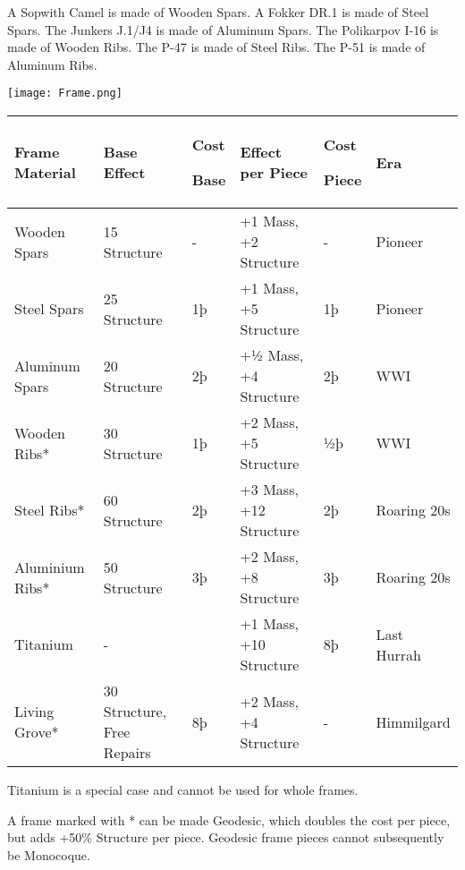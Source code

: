 \documentclass{article}
\begin{document}
A Sopwith Camel is made of Wooden Spars. A Fokker DR.1 is made of
Steel Spars. The Junkers J.1/J4 is made of Aluminum Spars. The
Polikarpov I-16 is made of Wooden Ribs. The P-47 is made of Steel Ribs.
The P-51 is made of Aluminum Ribs.

\texttt{[image: Frame.png]}

\begin{tabular}{|l|l|l|l|l|l|}
    \hline
    Frame Material  & Base Effect                & Cost

    Base            & Effect per Piece           & Cost

    Piece           & Era                                                                                 \\\hline
    Wooden Spars    & 15 Structure               & -          & +1 Mass, +2 Structure  & -  & Pioneer     \\\hline
    Steel Spars     & 25 Structure               & 1þ         & +1 Mass, +5 Structure  & 1þ &
    Pioneer                                                                                               \\\hline
    Aluminum Spars  & 20 Structure               & 2þ         & +½ Mass, +4 Structure  & 2þ & WWI         \\\hline
    Wooden Ribs*    & 30 Structure               & 1þ         & +2 Mass, +5 Structure  & ½þ & WWI         \\\hline
    Steel Ribs*     & 60 Structure               & 2þ         & +3 Mass, +12 Structure & 2þ & Roaring
    20s                                                                                                   \\\hline
    Aluminium Ribs* & 50 Structure               & 3þ         & +2 Mass, +8 Structure  & 3þ &
    Roaring 20s                                                                                           \\\hline
    Titanium        & -                          &            & +1 Mass, +10 Structure & 8þ & Last Hurrah \\\hline
    Living Grove*   & 30 Structure, Free Repairs & 8þ         & +2 Mass, +4 Structure
                    & -                          & Himmilgard                                             \\\hline
\end{tabular}

Titanium is a special case and cannot be used for whole frames.

A frame marked with * can be made Geodesic, which doubles the
cost per piece, but adds +50\% Structure per piece. Geodesic frame
pieces cannot subsequently be Monocoque.
\end{document}

